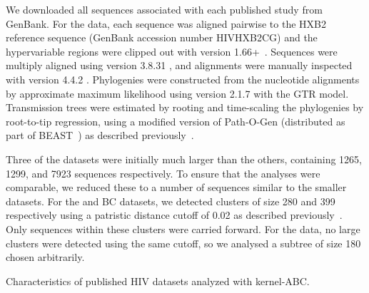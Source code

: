 We downloaded all sequences associated with each published study from GenBank.
For the \textcite{novitsky2014impact} data, each sequence was aligned pairwise
to the HXB2 reference sequence (GenBank accession number HIVHXB2CG) and the
hypervariable regions were clipped out with  version
1.66+~\autocite{cock2009biopython}. Sequences were multiply aligned using
 version 3.8.31 \autocite{edgar2004muscle}, and alignments
were manually inspected with  version 4.4.2
\autocite{gouy2010seaview}. Phylogenies were constructed from the nucleotide
alignments by approximate maximum likelihood using  version
2.1.7 with the \gls{GTR} model. Transmission trees were estimated by rooting
and time-scaling the phylogenies by root-to-tip regression, using a modified
version of Path-O-Gen (distributed as part of
BEAST~\autocite{drummond2007beast}) as described
previously~\autocite{poon2015phylodynamic}. 

Three of the datasets \autocite[][and the BC data]{li2015hiv,novitsky2014impact}
were initially much larger than the others, containing 1265, 1299, and 7923
sequences respectively. To ensure that the analyses were comparable, we reduced
these to a number of sequences similar to the smaller datasets. For the
\citeauthor{li2015hiv} and BC datasets, we detected clusters of size 280 and
399 respectively using a patristic distance cutoff of 0.02 as described
previously~\autocite{poon2014impact}. Only sequences within these clusters were
carried forward. For the \textcite{novitsky2014impact} data, no large clusters
were detected using the same cutoff, so we analysed a subtree of size 180
chosen arbitrarily.

\begin{table}[ht]
  \centering
  
  \caption{Characteristics of published HIV datasets analyzed with kernel-ABC.}
  \label{tab:realdata}
\end{table}

